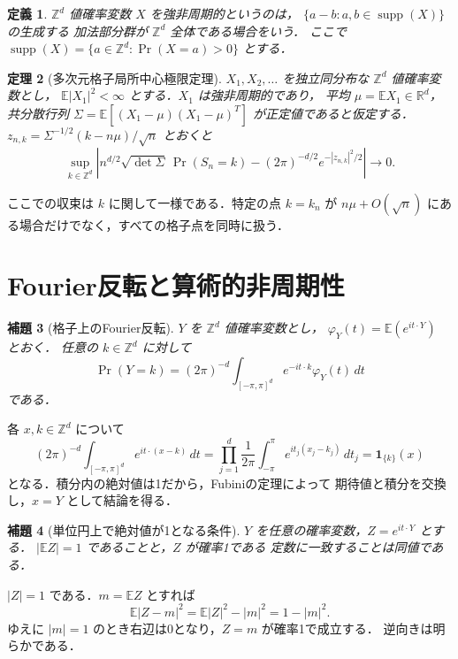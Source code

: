 \documentclass[a5paper,10pt,onecolumn]{jsarticle}
\makeatletter
\theoremstyle{mathnotetheorem}
\newtheorem{theorem}{定理}[section]
\newtheorem{definition}[theorem]{定義}
\newtheorem{lemma}[theorem]{補題}
\renewcommand{\proofname}{証明}
\renewenvironment{proof}[1][\proofname]{%
  \par\pushQED{\qed}\normalfont\topsep4\p@\@plus2\p@\relax
  \trivlist\item[\hskip\labelsep\bfseries #1]\ignorespaces
}{\popQED\endtrivlist\@endpefalse}
\makeatother
\begin{document}
\begin{definition}
$\mathbb Z^d$ 値確率変数 $X$ を\emph{強非周期的}というのは，
$\{a-b:a,b\in\operatorname{supp}(X)\}$ の生成する
加法部分群が $\mathbb Z^d$ 全体である場合をいう．
ここで $\operatorname{supp}(X)=\{a\in\mathbb Z^d:\Pr(X=a)>0\}$ とする．
\end{definition}

\begin{theorem}[多次元格子局所中心極限定理]\label{thm:llclt}
$X_1,X_2,\ldots$ を独立同分布な $\mathbb Z^d$ 値確率変数とし，
$\mathbb E|X_1|^2<\infty$ とする．$X_1$ は強非周期的であり，
平均 $\mu=\mathbb E X_1\in\mathbb R^d$，共分散行列
$\Sigma=\mathbb E[(X_1-\mu)(X_1-\mu)^T]$ が正定値であると仮定する．
$z_{n,k}=\Sigma^{-1/2}(k-n\mu)/\sqrt n$ とおくと
\[
 \sup_{k\in\mathbb Z^d}\left|
 n^{d/2}\sqrt{\det\Sigma}\,\Pr(S_n=k)
 -(2\pi)^{-d/2}e^{-|z_{n,k}|^2/2}
 \right|\longrightarrow0.
\]
\end{theorem}

ここでの収束は $k$ に関して一様である．特定の点 $k=k_n$ が
$n\mu+O(\sqrt n)$ にある場合だけでなく，すべての格子点を同時に扱う．

\section{Fourier反転と算術的非周期性}
\begin{lemma}[格子上のFourier反転]\label{lem:inv}
$Y$ を $\mathbb Z^d$ 値確率変数とし，
$\varphi_Y(t)=\mathbb E(e^{it\cdot Y})$ とおく．
任意の $k\in\mathbb Z^d$ に対して
\[
 \Pr(Y=k)=(2\pi)^{-d}\int_{[-\pi,\pi]^d}
             e^{-it\cdot k}\varphi_Y(t)\,dt
\]
である．
\end{lemma}
\begin{proof}
各 $x,k\in\mathbb Z^d$ について
\[
 (2\pi)^{-d}\int_{[-\pi,\pi]^d}e^{it\cdot(x-k)}\,dt
 =\prod_{j=1}^d\frac1{2\pi}\int_{-\pi}^{\pi}
         e^{it_j(x_j-k_j)}\,dt_j
 =\mathbf1_{\{k\}}(x)
\]
となる．積分内の絶対値は1だから，Fubiniの定理によって
期待値と積分を交換し，$x=Y$ として結論を得る．
\end{proof}

\begin{lemma}[単位円上で絶対値が1となる条件]\label{lem:unit}
$Y$ を任意の確率変数，$Z=e^{it\cdot Y}$ とする．
$|\mathbb EZ|=1$ であることと，$Z$ が確率1である
定数に一致することは同値である．
\end{lemma}
\begin{proof}
$|Z|=1$ である．$m=\mathbb EZ$ とすれば
\[
 \mathbb E|Z-m|^2=\mathbb E|Z|^2-|m|^2=1-|m|^2.
\]
ゆえに $|m|=1$ のとき右辺は0となり，$Z=m$ が確率1で成立する．
逆向きは明らかである．
\end{proof}
\end{document}
